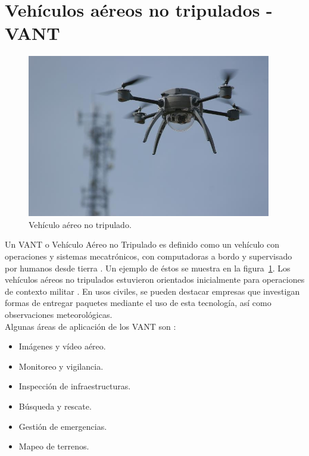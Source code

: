 \section{Vehículos aéreos no tripulados - VANT}

\begin{figure}[H]
\centering
\includegraphics[width=0.95\textwidth]{Figures/UAV}
\caption[Vehículo aéreo no tripulado.]{Vehículo aéreo no tripulado\footnotemark.}
\label{fig:UAV}
\end{figure}


Un VANT o Vehículo Aéreo no Tripulado es definido como un vehículo con operaciones y sistemas mecatrónicos, con computadoras a bordo y supervisado por humanos desde tierra \citep{haluani2015tecnologia}. Un ejemplo de éstos se muestra en la figura~\ref{fig:UAV}. Los vehículos aéreos no tripulados estuvieron orientados inicialmente para operaciones de contexto militar \citep{fahlstrom2012introduction}. En usos civiles, se pueden destacar empresas que investigan formas de entregar paquetes mediante el uso de esta tecnología, así como observaciones meteorológicas.\\

Algunas áreas de aplicación de los VANT son \citep{addati2014introduccion}:

\begin{itemize}
\item Imágenes y vídeo aéreo.
\item Monitoreo y vigilancia.
\item Inspección de infraestructuras.
\item Búsqueda y rescate.
\item Gestión de emergencias.
\item Mapeo de terrenos.
\end{itemize}

